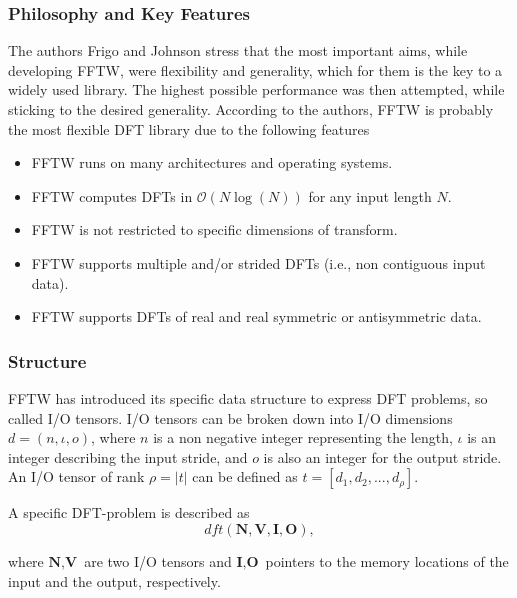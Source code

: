\documentclass{usiinftr}
\begin{document}
\subsubsection{Philosophy and Key Features}
The authors Frigo and Johnson stress that the most important aims, while developing FFTW, were flexibility and generality, which for them is the key to a widely used library.
The highest possible performance was then attempted, while sticking to the desired generality.
According to the authors, FFTW is probably the most flexible DFT library due to the following features\cite{JohnsonFr08:burrus}
\begin{itemize}
\item FFTW runs on many architectures and operating systems.
\item FFTW computes DFTs in $\mathcal{O} (N\log(N)) $ for any input length $N$.
\item FFTW is not restricted to specific dimensions of transform.
\item FFTW supports multiple and/or strided DFTs (i.e., non contiguous input data).
\item FFTW supports DFTs of real and real symmetric or antisymmetric data.
\end{itemize}


\subsubsection{Structure}
FFTW has introduced its specific data structure to express DFT problems, so called I/O tensors.
I/O tensors can be broken down into I/O dimensions $d = (n, \iota, o)$, where $n$ is a non negative integer representing the length, 
$\iota$ is an integer describing the input stride, and $o$ is also an integer for the output stride.
An I/O tensor of rank $\rho = |t|$ can be defined as $t = [ d_1, d_2, ... , d_{\rho} ]$.

A specific DFT-problem is described as
\begin{equation}
dft(\textbf{N}, \textbf{V}, \textbf{I}, \textbf{O}),
\end{equation}

where $\textbf{N}, \textbf{V}$ are two I/O tensors and $\textbf{I}, \textbf{O}$ pointers to the memory locations of the input and the output, respectively\cite{FFTW05}.
\end{document}
